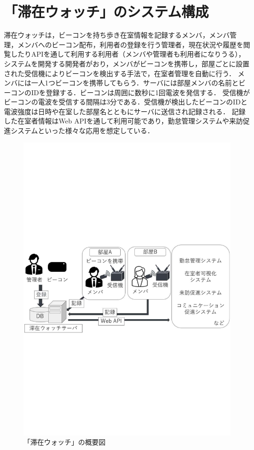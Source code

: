 

\section{「滞在ウォッチ」のシステム構成}\label{3.1}
滞在ウォッチは，ビーコンを持ち歩き在室情報を記録するメンバ，メンバ管理，メンバへのビーコン配布，利用者の登録を行う管理者，現在状況や履歴を閲覧したりAPIを通して利用する利用者（メンバや管理者も利用者になりうる），システムを開発する開発者がおり，メンバがビーコンを携帯し，部屋ごとに設置された受信機によりビーコンを検出する手法で，在室者管理を自動に行う．
メンバには一人1つビーコンを携帯してもらう．サーバには部屋メンバの名前とビーコンのIDを登録する．ビーコンは周囲に数秒に1回電波を発信する．
受信機がビーコンの電波を受信する間隔は3分である．受信機が検出したビーコンのIDと電波強度は日時や在室した部屋名とともにサーバに送信され記録される．
記録した在室者情報はWeb APIを通して利用可能であり，勤怠管理システムや来訪促進システムといった様々な応用を想定している．

\begin{figure}[h]
  \centering  %
  \includegraphics[clip,scale = 0.6]{image/system.pdf}
  \caption{「滞在ウォッチ」の概要図}    \label{StayWatchOverview}
\end{figure}

